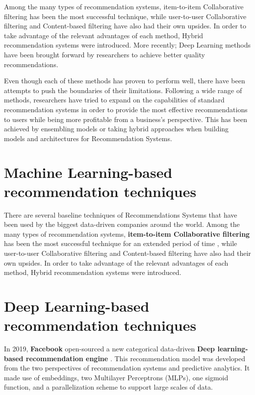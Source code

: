 \documentclass[manuscript,screen,review]{acmart}
\begin{document}
Among the many types of recommendation systems, item-to-item Collaborative filtering has been the most successful technique, while user-to-user Collaborative filtering and Content-based filtering have also had their own upsides. In order to take advantage of the relevant advantages of each method, Hybrid recommendation systems were introduced. More recently; Deep Learning methods have been brought forward by researchers to achieve better quality recommendations.

Even though each of these methods has proven to perform well, there have been attempts to push the boundaries of their limitations. Following a wide range of methods, researchers have tried to expand on the capabilities of standard recommendation systems in order to provide the most effective recommendations to users while being more profitable from a business's perspective. This has been achieved by ensembling models or taking hybrid approaches when building models and architectures for Recommendation Systems.

\section{Machine Learning-based recommendation techniques}
There are several baseline techniques of Recommendations Systems that have been used by the biggest data-driven companies around the world.
Among the many types of recommendation systems, \textbf{item-to-item Collaborative filtering} \cite{linden_amazoncom_2003} has been the most successful technique for an extended period of time \cite{smith_two_2017}, while user-to-user Collaborative filtering and Content-based filtering have also had their own upsides. In order to take advantage of the relevant advantages of each method, Hybrid recommendation systems \cite{geetha_hybrid_2018} were introduced. 


\section{Deep Learning-based recommendation techniques}
In 2019, \textbf{Facebook} open-sourced a new categorical data-driven \textbf{Deep learning-based recommendation engine} \cite{naumov_deep_2019, noauthor_we_2019}. This recommendation model was developed from the two perspectives of recommendation systems and predictive analytics. It made use of embeddings, two Multilayer Perceptrons (MLPs), one sigmoid function, \cite{freudenthaler_factorization_2011} and a parallelization scheme to support large scales of data.
\end{document}
